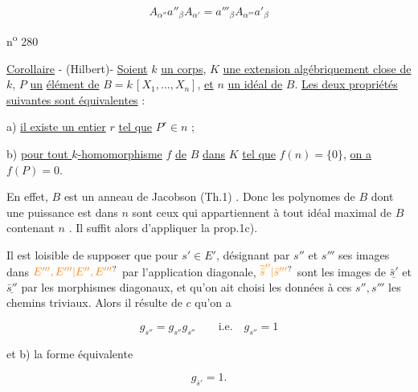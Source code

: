 \[
\boxed{A_{\alpha''}a''_\beta A_{\alpha'}=a'''_\beta A_{\alpha'''}a'_\beta}
\]


\hfill n\textsuperscript{o} 280

\uline{Corollaire} - (Hilbert)- \uline{Soient} $k$ \uline{un corps}, $K$ \uline{une extension algébriquement close de} $k$, $P$ \uline{un} \uline{élément de} $B=k\,[X_1,\ldots,X_n]$, \uline{et} $n$ \uline{un idéal de} $B$. \uline{Les deux propriétés suivantes sont équivalentes} :

a) \uline{il existe un entier} $r$ \uline{tel que} $P^r\in n$ ;

b) \uline{pour tout $k$-homomorphisme} $f$ \uline{de} $B$ \uline{dans} $K$ \uline{tel que} $f(n)=\{0\}$, \uline{on a} $f(P)=0$.

En effet, $B$ est un anneau de Jacobson (Th.1) . Donc les polynomes de $B$ dont une puissance est dans $n$ sont ceux qui appartiennent à tout idéal maximal de $B$ contenant $n$ . Il suffit alors d'appliquer la prop.1c).



Il est loisible de supposer que pour  $s'\in E'$, désignant par $s''$ et $s'''$ ses images dans $\unsure{E''',E'''|E'',E'''}$ par l'application diagonale,  $\unsure{\widetilde{\bar s}''|\bar s'''}$ sont les images de $\underline{\bar s'}$ et $\underline{\bar s''}$ par les morphismes diagonaux, et qu'on ait choisi  les données   à ces $s'',s'''$  les chemins triviaux.  Alors il résulte de $c$ qu'on a

\[
g_{s''}=g_{s''}g_{s''}\qquad\text{i.e.}\quad g_{s''}=1
\]

et  b)  la forme équivalente

\[
\tag*{b')}g_{\bar s'}=1.
\]


